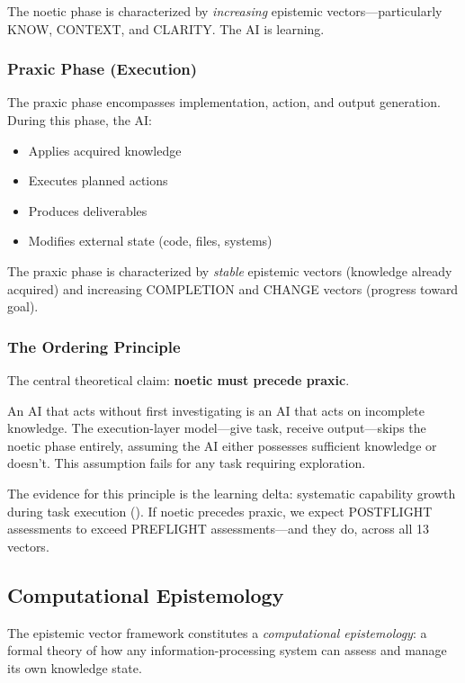The noetic phase is characterized by \emph{increasing} epistemic vectors---particularly KNOW, CONTEXT, and CLARITY. The AI is learning.

\subsubsection{Praxic Phase (Execution)}

The praxic phase encompasses implementation, action, and output generation. During this phase, the AI:

\begin{itemize}
    \item Applies acquired knowledge
    \item Executes planned actions
    \item Produces deliverables
    \item Modifies external state (code, files, systems)
\end{itemize}

The praxic phase is characterized by \emph{stable} epistemic vectors (knowledge already acquired) and increasing COMPLETION and CHANGE vectors (progress toward goal).

\subsubsection{The Ordering Principle}

The central theoretical claim: \textbf{noetic must precede praxic}.

An AI that acts without first investigating is an AI that acts on incomplete knowledge. The execution-layer model---give task, receive output---skips the noetic phase entirely, assuming the AI either possesses sufficient knowledge or doesn't. This assumption fails for any task requiring exploration.

The evidence for this principle is the learning delta: systematic capability growth during task execution (). If noetic precedes praxic, we expect POSTFLIGHT assessments to exceed PREFLIGHT assessments---and they do, across all 13 vectors.

\subsection{Computational Epistemology}

The epistemic vector framework constitutes a \emph{computational epistemology}: a formal theory of how any information-processing system can assess and manage its own knowledge state.

